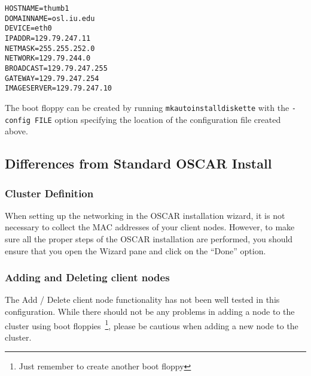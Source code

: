 \begin{verbatim}
HOSTNAME=thumb1
DOMAINNAME=osl.iu.edu
DEVICE=eth0
IPADDR=129.79.247.11
NETMASK=255.255.252.0
NETWORK=129.79.244.0
BROADCAST=129.79.247.255
GATEWAY=129.79.247.254
IMAGESERVER=129.79.247.10
\end{verbatim}

The boot floppy can be created by running {\tt mkautoinstalldiskette}
with the {\tt -config FILE} option specifying the location of the
configuration file created above.

\subsection{Differences from Standard OSCAR Install}

\subsubsection{Cluster Definition}

When setting up the networking in the OSCAR installation wizard, it is
not necessary to collect the MAC addresses of your client nodes.
However, to make sure all the proper steps of the OSCAR installation
are performed, you should ensure that you open the Wizard pane and
click on the ``Done'' option.

\subsubsection{Adding and Deleting client nodes}

The Add / Delete client node functionality has not been well tested in
this configuration.  While there should not be any problems in adding
a node to the cluster using boot floppies~\footnote{Just remember to
create another boot floppy}, please be cautious when adding a new node
to the cluster.
